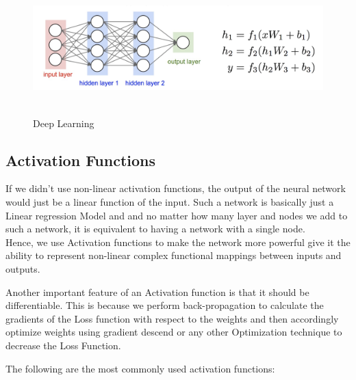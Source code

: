 \documentclass[twoside]{article}
\begin{document}
\begin{figure}[!htb]
\centering
\includegraphics[height = 2in]{pics/deep_learning.png}
\caption{Deep Learning\cite{}}
\label{fig:Deep Learning}
\end{figure}

\subsection{Activation Functions}

If we didn't use non-linear activation functions, the output of the neural network would just be a linear function of the input. Such a network is basically just a Linear regression Model and and no matter how many layer and nodes we add to such a network, it is equivalent to having a network with a single node.\\

Hence, we use Activation functions to make the network more powerful give it the ability to represent non-linear complex functional mappings between inputs and outputs.

Another important feature of an Activation function is that it should be differentiable. This is because we perform back-propagation to calculate the gradients of the Loss function with respect to the weights and then accordingly optimize weights using gradient descend or any other Optimization technique to decrease the Loss Function.

The following are the most commonly used activation functions:
\end{document}
